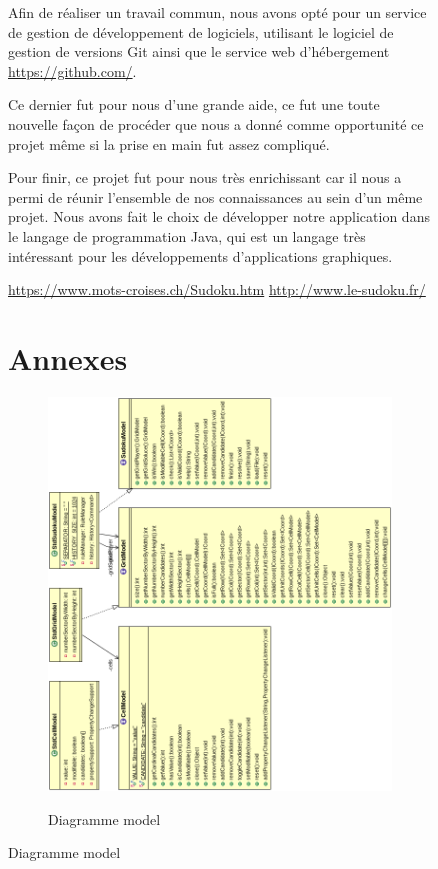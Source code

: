 \begin{figure}[ht]
Afin de réaliser un travail commun, nous avons opté pour un service 
de gestion de développement de logiciels, utilisant le logiciel 
de gestion de versions Git ainsi que le service web d'hébergement \url{https://github.com/}.

Ce dernier fut pour nous d'une grande aide, ce fut une toute nouvelle façon de 
procéder que nous a donné comme opportunité ce projet même si la prise en main 
fut assez compliqué.

Pour finir, ce projet fut pour nous très enrichissant car il nous a permi de réunir
l'ensemble de nos connaissances au sein d'un même projet. Nous avons fait le choix 
de développer notre application dans le langage de programmation Java, qui est un langage
très intéressant pour les développements d'applications graphiques.

\begin{thebibliography}{9}
          \url{https://www.mots-croises.ch/Sudoku.htm}
          \url{http://www.le-sudoku.fr/}
\end{thebibliography}

\section{Annexes}
\begin{figure}[ht]
  \caption{\label{annexe16} Diagramme model}
  \includegraphics [width=160mm]{images/model.png} \\[0.5cm]
\end{figure}


\end{figure}

